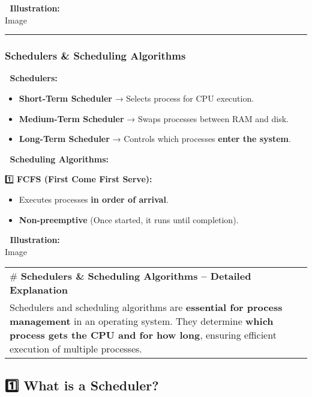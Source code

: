 \documentclass[
]{article}
\providecommand{\tightlist}{%
  \setlength{\itemsep}{0pt}\setlength{\parskip}{0pt}}
\begin{document}
📌 \textbf{Illustration:}\\
{Image}

\begin{center}\rule{0.5\linewidth}{0.5pt}\end{center}

\subsubsection{\texorpdfstring{\textbf{Schedulers \& Scheduling
Algorithms}}{Schedulers \& Scheduling Algorithms}}\label{schedulers-scheduling-algorithms}

📌 \textbf{Schedulers:}

\begin{itemize}
\tightlist
\item
  \textbf{Short-Term Scheduler} → Selects process for CPU execution.
\item
  \textbf{Medium-Term Scheduler} → Swaps processes between RAM and disk.
\item
  \textbf{Long-Term Scheduler} → Controls which processes \textbf{enter
  the system}.
\end{itemize}

📌 \textbf{Scheduling Algorithms:}

1️⃣ \textbf{FCFS (First Come First Serve):}

\begin{itemize}
\tightlist
\item
  Executes processes \textbf{in order of arrival}.
\item
  \textbf{Non-preemptive} (Once started, it runs until completion).
\end{itemize}

📌 \textbf{Illustration:}\\
{Image}

\begin{longtable}[]{@{}
  >{\raggedright\arraybackslash}p{}@{}}
\toprule\noalign{}
\endhead
\bottomrule\noalign{}
\endlastfoot
\# \textbf{Schedulers \& Scheduling Algorithms -- Detailed
Explanation} \\
Schedulers and scheduling algorithms are \textbf{essential for process
management} in an operating system. They determine \textbf{which process
gets the CPU and for how long}, ensuring efficient execution of multiple
processes. \\
\end{longtable}

\subsection{\texorpdfstring{\textbf{1️⃣ What is a
Scheduler?}}{1️⃣ What is a Scheduler?}}\label{what-is-a-scheduler}
\end{document}
